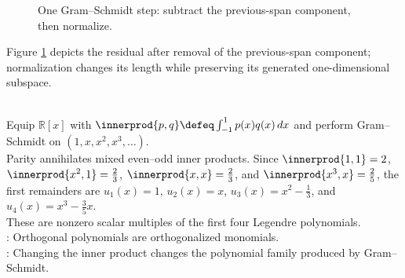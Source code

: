 \begin{figure}[H]
  \centering
  
  \caption{One Gram--Schmidt step: subtract the previous-span component, then normalize.}
  \label{fig:gram-schmidt-step}
\end{figure}

Figure \ref{fig:gram-schmidt-step} depicts the residual after removal of the previous-span component; normalization changes its length while preserving its generated one-dimensional subspace.

\begin{example} \label{ex:gram-schmidt-legendre-polynomials} \\
Equip $\mathbb{R}[x]$ with $\innerprod{p,q}\defeq\int_{-1}^{1}p(x)q(x)\,dx$ and perform Gram--Schmidt on $(1,x,x^2,x^3,\ldots)$.\\
Parity annihilates mixed even--odd inner products. Since $\innerprod{1,1}=2$, $\innerprod{x^2,1}=\frac{2}{3}$, $\innerprod{x,x}=\frac{2}{3}$, and $\innerprod{x^3,x}=\frac{2}{5}$, the first remainders are $u_1(x)=1$, $u_2(x)=x$, $u_3(x)=x^2-\frac{1}{3}$, and $u_4(x)=x^3-\frac{3}{5}x$.\\
These are nonzero scalar multiples of the first four Legendre polynomials.\\
: Orthogonal polynomials are orthogonalized monomials.\\
: Changing the inner product changes the polynomial family produced by Gram--Schmidt.
\end{example}
\par

